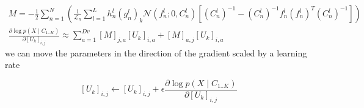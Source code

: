 \documentclass{paper}
\begin{document}
\begin{eqnarray}
M = -\frac{1}{2} \sum_{n=1}^N \left(\frac{1}{\mathcal{L}_n}  \sum_{l=1}^{L} h_n^l (g_n^l)_k \mathcal{N}(f_n^l;0,C_n^l)   \left[ (C_n^l)^{-1} - (C_n^l)^{-1} f_n^l (f_n^l)^T (C_n^l)^{-1} \right] \right) \\
\frac{\partial \log p(X \mid C_{1..K})}{\partial \left[ U_k \right]_{i,j}} \approx \sum_{a=1}^{Dv} \left[ M \right]_{j,a} \left[ U_k \right]_{i,a} + \left[ M \right]_{a,j} \left[ U_k \right]_{i,a}
\end{eqnarray}
%
we can move the parameters in the direction of the gradient scaled by a learning rate

\begin{equation}
\left[ U_k \right]_{i,j} \leftarrow \left[ U_k \right]_{i,j} + \epsilon \frac{\partial \log p(X \mid C_{1..K})}{\partial \left[ U_k \right]_{i,j}}
\end{equation}
\end{document}

